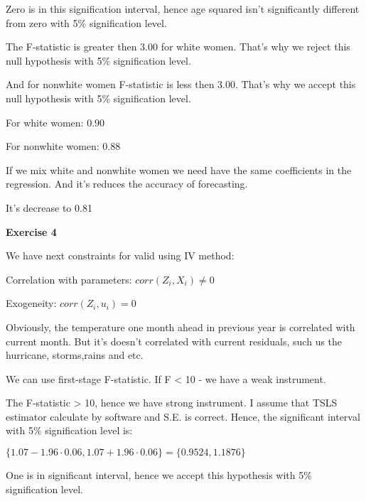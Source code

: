 \documentclass[12pt]{article}
\begin{document}
\begin{list}{()~}{}
\begin{list}{)~}{}
	Zero is in this signification interval, hence age squared isn't significantly different from zero with 5\% signification level.
	\end{list}
	
\item The F-statistic is greater then 3.00 for white women. That's why we reject this null hypothesis with 5\% signification level.

And for nonwhite women F-statistic is less then 3.00. That's why we accept this null hypothesis with 5\% signification level.

\item For white women: $0.90$

For nonwhite women: $0.88$

If we mix white and nonwhite women we need have the same coefficients in the regression. And it's reduces the accuracy of forecasting.

\item It's decrease to 0.81

\bigskip
	
\textbf{Exercise 4}
\begin{list}{)~}{}	
\item We have next constraints for valid using IV method:
\begin{list}{)~}{}	
\item Correlation with parameters: $corr\left(Z_i, X_i\right) \neq 0$
\item Exogeneity: $corr\left(Z_i, u_i\right)= 0$
\end{list}
Obviously, the temperature one month ahead in previous year is correlated with current month. But it's doesn't correlated with current residuals, such us the hurricane, storms,rains and etc.
\item We can use first-stage F-statistic. If F < 10 - we have a weak instrument. 
\item The F-statistic > 10, hence we have strong instrument.
I assume that TSLS estimator calculate by software and S.E. is correct. Hence, the significant interval with 5\% signification level is:

$\{ 1.07-1.96 \cdot 0.06, 1.07+1.96 \cdot 0.06 \} = \{ 0.9524, 1.1876 \}$

One is in significant interval, hence we accept this hypothesis with 5\% signification level.

\end{list}


\end{list}
\end{document}
